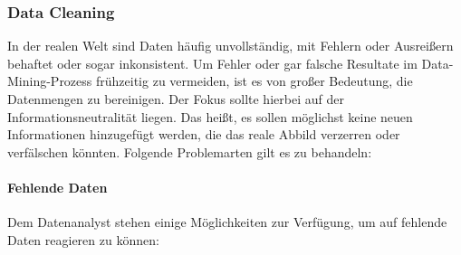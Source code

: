 \subsubsection{Data Cleaning}
\label{dc}
In der realen Welt sind Daten häufig \glqq unvollständig, mit Fehlern oder Ausreißern behaftet oder sogar inkonsistent.\grqq{} Um Fehler oder gar falsche Resultate im Data-Mining-Prozess frühzeitig zu vermeiden, ist es von großer Bedeutung, die Datenmengen zu bereinigen. Der Fokus sollte hierbei auf der Informationsneutralität liegen. Das heißt, es sollen möglichst keine neuen Informationen hinzugefügt werden, die das reale Abbild verzerren oder verfälschen könnten. Folgende Problemarten gilt es zu behandeln:

\paragraph{Fehlende Daten} 
Dem Datenanalyst stehen einige Möglichkeiten zur Verfügung, um auf fehlende Daten reagieren zu können:

